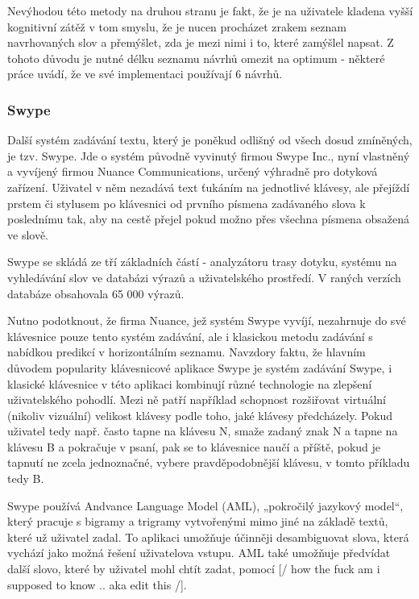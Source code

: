 \documentclass{article}
\begin{document}
Nevýhodou této metody na druhou stranu je fakt, že je na uživatele kladena vyšší kognitivní zátěž v tom smyslu, že je nucen procházet zrakem seznam navrhovaných slov a přemýšlet, zda je mezi nimi i to, které zamýšlel napsat. Z tohoto důvodu je nutné délku seznamu návrhů omezit na optimum - některé práce uvádí, že ve své implementaci používají 6 návrhů.

\subsubsection{Swype}

Další systém zadávání textu, který je poněkud odlišný od všech dosud zmíněných, je tzv. Swype. Jde o systém původně vyvinutý firmou Swype Inc., nyní vlastněný a vyvíjený firmou Nuance Communications, určený výhradně pro dotyková zařízení. Uživatel v něm nezadává text ťukáním na jednotlivé klávesy, ale přejíždí prstem či stylusem po klávesnici od prvního písmena zadávaného slova k poslednímu tak, aby na cestě přejel pokud možno přes všechna písmena obsažená ve slově. %


Swype se skládá ze tří základních částí - analyzátoru trasy dotyku, systému na vyhledávání slov ve databázi výrazů a uživatelského prostředí. V raných verzích databáze obsahovala 65 000 výrazů.

Nutno podotknout, že firma Nuance, jež systém Swype vyvíjí, nezahrnuje do své klávesnice pouze tento systém zadávání, ale i klasickou metodu zadávání s nabídkou predikcí v horizontálním seznamu. Navzdory faktu, že hlavním důvodem popularity klávesnicové aplikace Swype je systém zadávání Swype, i klasické klávesnice v této aplikaci kombinují různé technologie na zlepšení uživatelského pohodlí. Mezi ně patří například schopnost rozšiřovat virtuální (nikoliv vizuální) velikost klávesy podle toho, jaké klávesy předcházely. Pokud uživatel tedy např. často tapne na klávesu N, smaže zadaný znak N a tapne na klávesu B a pokračuje v psaní, pak se to klávesnice naučí a příště, pokud je tapnutí ne zcela jednoznačné, vybere pravděpodobnější klávesu, v tomto příkladu tedy B. %


Swype používá Andvance Language Model (AML), „pokročilý jazykový model“, který pracuje s bigramy a trigramy vytvořenými mimo jiné na základě textů, které už uživatel zadal. To aplikaci umožňuje účinněji desambiguovat slova, která vychází jako možná řešení uživatelova vstupu. AML také umožňuje předvídat další slovo, které by uživatel mohl chtít zadat, pomocí [/ how the fuck am i supposed to know .. aka edit this /].
\end{document}
